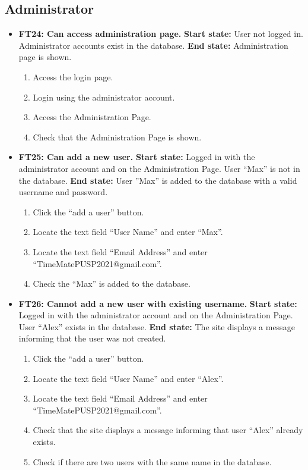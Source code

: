\documentclass{article}
\begin{document}
\subsection{Administrator}
\begin{itemize}
		\item \textbf{FT24: Can access administration page.} \newline
		\textbf{Start state:} User not logged in. Administrator accounts exist in the database.
 \newline
		\textbf{End state:} Administration page is shown.
		\begin{enumerate}
			\item Access the login page.
			\item Login using the administrator account.
			\item Access the Administration Page.
			\item Check that the Administration Page is shown.
		\end{enumerate}
		
		\item \textbf{FT25: Can add a new user.} \newline
		\textbf{Start state:} Logged in with the administrator account and on the Administration Page. User “Max” is not in the database. \newline
		\textbf{End state:} User ”Max” is added to the database with a valid username and password.
		\begin{enumerate}
			\item Click the “add a user” button.
			\item Locate the text field “User Name” and enter “Max”.
			\item Locate the text field “Email Address” and enter “TimeMatePUSP2021@gmail.com”.
			\item Check the “Max” is added to the database.
		\end{enumerate}
		
		
		\item \textbf{FT26: Cannot add a new user with existing username.} \newline
		\textbf{Start state:}  Logged in with the administrator account and on the Administration Page. User “Alex” exists in the database.\newline
		\textbf{End state:} The site displays a message informing that the user was not created.
		\begin{enumerate}
			\item Click the “add a user” button.
			\item Locate the text field “User Name” and enter “Alex”.
			\item Locate the text field “Email Address” and enter “TimeMatePUSP2021@gmail.com”.
			\item Check that the site displays a message informing that user “Alex” already exists.
			\item Check if there are two users with the same name in the database.
		\end{enumerate}
		

\end{itemize}
\end{document}
